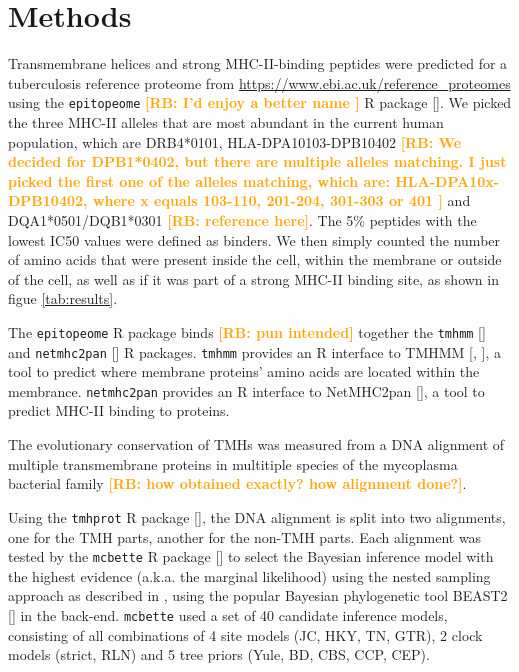 \documentclass{article}
\newcommand{\richel}[1]{\textcolor{orange}{\textbf{[RB: #1]}}}
\begin{document}
\section{Methods}

Transmembrane helices and strong MHC-II-binding peptides
were predicted for a tuberculosis reference proteome 
from \url{https://www.ebi.ac.uk/reference_proteomes}
using the \verb;epitopeome; 
\richel{
  I'd enjoy a better name
}
R package [\cite{epitopeome}].
We picked the three MHC-II alleles that are most abundant 
in the current human population, 
which are DRB4*0101, HLA-DPA10103-DPB10402 
\richel{
  We decided for DPB1*0402, but there are multiple alleles matching.
  I just picked the first one of the alleles matching, which are:
  HLA-DPA10x-DPB10402, where x equals 103-110, 201-204, 301-303 or 401
}
and DQA1*0501/DQB1*0301 \richel{reference here}.
The 5\% peptides with the lowest IC50 values were defined as binders.
We then simply counted the number of amino acids that were present inside the
cell, within the membrane or outside of the cell, as well as if it was part 
of a strong MHC-II binding site, as shown in figue \ref{tab:results}.


The \verb;epitopeome; R package \cite{epitopeome} binds \richel{pun intended} 
together the \verb;tmhmm; [\cite{tmhmm}] and \verb;netmhc2pan; 
[\cite{netmhc2pan}] 
R packages. \verb;tmhmm; provides an R interface to
TMHMM [\cite{krogh2001predicting}, \cite{sonnhammer1998hidden}], a tool
to predict where membrane proteins' amino acids are located within the
membrance.   
\verb;netmhc2pan; provides an R interface to
NetMHC2pan [\cite{jensen2018improved}], a tool
to predict MHC-II binding to proteins.

The evolutionary conservation of TMHs was measured from a
DNA alignment of multiple transmembrane proteins in multitiple
species of the mycoplasma bacterial family
\richel{how obtained exactly? how alignment done?}.

Using the \verb;tmhprot; R package [\cite{tmhprot}], the DNA alignment is split
into two alignments, one for the TMH parts, another for the non-TMH
parts. Each alignment was tested by the \verb;mcbette; 
R package [\cite{mcbette}] to select the Bayesian inference model with
the highest evidence (a.k.a. the marginal likelihood) using the nested
sampling approach as described in \cite{maturana2018model},
using the popular Bayesian phylogenetic tool 
BEAST2 [\cite{bouckaert2014beast}] in the back-end.
\verb;mcbette; used a set of 40 candidate inference models, 
consisting of all combinations of 
4 site models (JC, HKY, TN, GTR), 
2 clock models (strict, RLN) and 
5 tree priors (Yule, BD, CBS, CCP, CEP).
\end{document}
